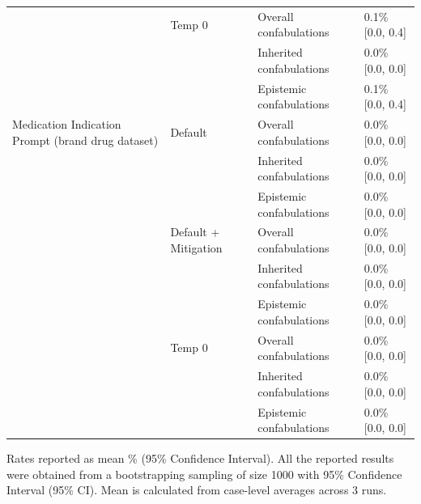 \begin{tabular}{llll}
 & Temp 0 & Overall confabulations & 0.1\% [0.0, 0.4] \\
 &  & Inherited confabulations & 0.0\% [0.0, 0.0] \\
 &  & Epistemic confabulations & 0.1\% [0.0, 0.4] \\
Medication Indication Prompt (brand drug dataset) & Default & Overall confabulations & 0.0\% [0.0, 0.0] \\
 &  & Inherited confabulations & 0.0\% [0.0, 0.0] \\
 &  & Epistemic confabulations & 0.0\% [0.0, 0.0] \\
 & Default + Mitigation & Overall confabulations & 0.0\% [0.0, 0.0] \\
 &  & Inherited confabulations & 0.0\% [0.0, 0.0] \\
 &  & Epistemic confabulations & 0.0\% [0.0, 0.0] \\
 & Temp 0 & Overall confabulations & 0.0\% [0.0, 0.0] \\
 &  & Inherited confabulations & 0.0\% [0.0, 0.0] \\
 &  & Epistemic confabulations & 0.0\% [0.0, 0.0] \\
\bottomrule
\end{tabular}

\medskip
\noindent


Rates reported as mean \% (95\% Confidence Interval). All the reported results were obtained from a bootstrapping sampling of size 1000 with 95\% Confidence Interval (95\% CI). Mean is calculated from case-level averages across 3 runs.

